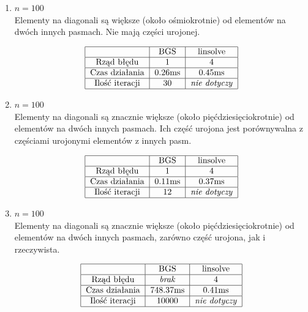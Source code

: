\documentclass[12pt]{article}
\begin{document}
\begin{enumerate}[label=\textbf{Układ \arabic*}]
		\item
			$n = 100$\\
			Elementy na diagonali są większe (około ośmiokrotnie) od elementów na dwóch innych pasmach. Nie mają części urojonej.
			
			\begin{align*}
				\begin{tabular}{|c|c|c|}
					\hline
					               &       BGS       &       linsolve       \\ \hline
					  Rząd błędu   &        1        &          4           \\ \hline
					Czas działania & $0.26\text{ms}$ &   $0.45\text{ms}$    \\ \hline
					Ilość iteracji &       30        & \textit{nie dotyczy} \\ \hline
				\end{tabular}
			\end{align*}
		
		\item
			$n = 100$\\
			Elementy na diagonali są znacznie większe (około pięćdziesięciokrotnie) od elementów na dwóch innych pasmach. Ich część urojona jest porównywalna z częściami urojonymi elementów z innych pasm.
			
			\begin{align*}
				\begin{tabular}{|c|c|c|}
					\hline
					               &       BGS       &       linsolve       \\ \hline
					  Rząd błędu   &        1        &          4           \\ \hline
					Czas działania & $0.11\text{ms}$ &   $0.37\text{ms}$    \\ \hline
					Ilość iteracji &       12        & \textit{nie dotyczy} \\ \hline
				\end{tabular}
			\end{align*}
		
		\item
			$n = 100$\\
			Elementy na diagonali są znacznie większe (około pięćdziesięciokrotnie) od elementów na dwóch innych pasmach, zarówno część urojona, jak i rzeczywista.
			
			\begin{align*}
				\begin{tabular}{|c|c|c|}
					\hline
					               &        BGS        &       linsolve       \\ \hline
					  Rząd błędu   &   \textit{brak}   &          4           \\ \hline
					Czas działania & $748.37\text{ms}$ &   $0.41\text{ms}$    \\ \hline
					Ilość iteracji &       10000       & \textit{nie dotyczy} \\ \hline
				\end{tabular}
			\end{align*}
	\end{enumerate}
\end{document}
